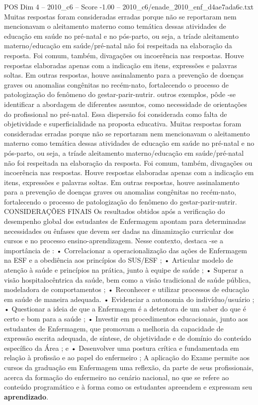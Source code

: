\begin{textsample}{POS Dim 4 – 2010\_c6 – Score -1.00 – 2010\_c6/enade\_2010\_enf\_d4ae7ada6c.txt}
Muitas respostas foram consideradas erradas porque não se reportaram nem mencionavam o aleitamento materno como temática dessas atividades de educação em saúde no pré-natal e no pós-parto, ou seja, a tríade aleitamento materno/educação em saúde/pré-natal não foi respeitada na elaboração da resposta.
Foi comum, também, divagações ou incoerência nas respostas.
Houve respostas elaboradas apenas com a indicação em itens, expressões e palavras soltas.
Em outras respostas, houve assinalamento para a prevenção de doenças graves ou anomalias congênitas no recém-nato, fortalecendo o processo de patologização do fenômeno do gestar-parir-nutrir. outros exemplos, pôde -se identificar a abordagem de diferentes assuntos, como necessidade de orientações do profissional no pré-natal.
Essa dispersão foi considerada como falta de objetividade e superficialidade na proposta educativa.
Muitas respostas foram consideradas erradas porque não se reportaram nem mencionavam o aleitamento materno como temática dessas atividades de educação em saúde no pré-natal e no pós-parto, ou seja, a tríade aleitamento materno/educação em saúde/pré-natal não foi respeitada na elaboração da resposta.
Foi comum, também, divagações ou incoerência nas respostas.
Houve respostas elaboradas apenas com a indicação em itens, expressões e palavras soltas.
Em outras respostas, houve assinalamento para a prevenção de doenças graves ou anomalias congênitas no recém-nato, fortalecendo o processo de patologização do fenômeno do gestar-parir-nutrir.
CONSIDERAÇÕES FINAIS Os resultados obtidos após a verificação do desempenho global dos estudantes de Enfermagem apontam para determinadas necessidades ou ênfases que devem ser dadas na dinamização curricular dos cursos e no processo ensino-aprendizagem.
Nesse contexto, destaca -se a importância de : • Correlacionar a operacionalização das ações de Enfermagem na ESF e a obediência aos princípios do SUS/ESF ; • Articular modelo de atenção à saúde e princípios na prática, junto à equipe de saúde ; • Superar a visão hospitalocêntrica da saúde, bem como a visão tradicional de saúde pública, modeladora de comportamentos ; • Reconhecer e utilizar processos de educação em saúde de maneira adequada. • Evidenciar a autonomia do indivíduo/usuário ; • Questionar a ideia de que a Enfermagem é a detentora de um saber do que é certo e bom para a saúde ; • Investir em procedimentos educacionais, junto aos estudantes de Enfermagem, que promovam a melhoria da capacidade de expressão escrita adequada, de síntese, de objetividade e de domínio do conteúdo específico da Área ; e • Desenvolver uma postura crítica e fundamentada em relação à profissão e ao papel do enfermeiro ; A aplicação do Exame permite aos cursos da graduação em Enfermagem uma reflexão, da parte de seus profissionais, acerca da formação do enfermeiro no cenário nacional, no que se refere ao conteúdo programático e à forma como os estudantes apreendem e expressam seu \textbf{aprendizado}.

\end{textsample}
